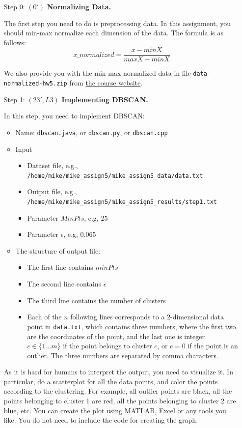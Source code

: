 \begin{enumerate}
\item[Step 0:] $(0')$ \textbf{Normalizing Data.}

The first step you need to do is preprocessing data. In this assignment, you should min-max normalize each dimension of the data. The formula is as follows:
$$x\_normalized=\frac{x-minX}{maxX-minX}$$

We also provide you with the min-max-normalized data in file {\tt data-normalized-hw5.zip} from \href{https://wiki.cites.illinois.edu/wiki/display/cs412fa15/Assignments}{the course website}.

\item[Step 1:] $(23', L3)$ \textbf{Implementing DBSCAN.} 
  
In this step, you need to implement DBSCAN: 
\begin{itemize}
\item Name: {\tt dbscan.java}, or {\tt dbscan.py}, or {\tt dbscan.cpp}
\item Input
\begin{itemize}
\item Dataset file, e.g., {\tt /home/mike/mike\_assign5/mike\_assign5\_data/data.txt}
\item Output file, e.g., {\tt /home/mike/mike\_assign5/mike\_assign5\_results/step1.txt}
\item Parameter $MinPts$, e.g, 25
\item Parameter $\epsilon$, e.g, 0.065
\end{itemize}
\item The structure of output file:
\begin{itemize}
\item The first line contains $minPts$ 
\item The second line contains $\epsilon$
\item The third line contains the number of clusters
\item Each of the $n$ following lines corresponds to a 2-dimensional data point in {\tt data.txt}, which contains three numbers, where the first two are the coordinates of the point, and the last one is integer $c \in \{1 \ldots m\}$ if the point belongs to cluster $c$, or $c=0$ if the point is an outlier. The three numbers are separated by comma characters.
\end{itemize}
\end{itemize}

As it is hard for humans to interpret the output, you need to visualize it. In particular, do a scatterplot for all the data points, and color the points according to the clustering. For example, all outlier points are black, all the points belonging to cluster 1 are red, all the points belonging to cluster 2 are blue, etc. You can create the plot using MATLAB, Excel or any tools you like. You do not need to include the code for creating the graph.


\end{enumerate}
